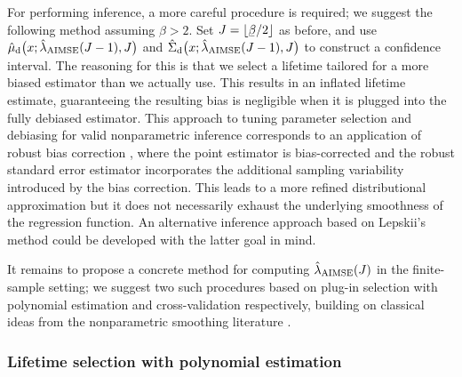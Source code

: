 For performing inference, a more careful procedure is required;
we suggest the following method assuming $\beta > 2$.
Set $J = \lfloor \flbeta / 2 \rfloor$ as before,
and use $\hat\mu_{\mathrm{d}}\big(x; \hat\lambda_{\operatorname{AIMSE}}(J-1), J\big)$
and $\hat\Sigma_{\mathrm{d}}\big(x; \hat\lambda_{\operatorname{AIMSE}}(J-1), J\big)$
to construct a confidence interval.
The reasoning for this is that we select a lifetime tailored for a more biased
estimator than we actually use. This results in an inflated lifetime estimate,
guaranteeing the resulting bias is negligible when it is plugged into the fully
debiased estimator. This approach to tuning parameter selection and debiasing
for valid nonparametric inference corresponds to an application of robust bias
correction \citep{calonico2018jasa,calonico2022bernoulli},
where the point estimator is bias-corrected
and the robust standard error estimator incorporates the additional
sampling variability introduced by the bias correction.
This leads to a more refined distributional approximation
but it does not necessarily exhaust the underlying
smoothness of the regression function.
An alternative inference approach based on Lepskii's method
\citep{lepskii1992asymptotically,birge2001alternative}
could be developed with the latter goal in mind.

It remains to propose a concrete method for computing $\hat\lambda_{\operatorname{AIMSE}}(J)$
in the finite-sample setting; we suggest two such procedures based on plug-in
selection with polynomial estimation and cross-validation respectively,
building on classical ideas from the nonparametric
smoothing literature \citep{fan2020statistical}.

\subsubsection*{Lifetime selection with polynomial estimation}

